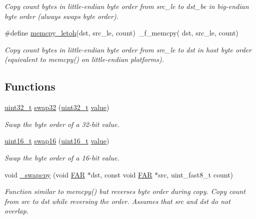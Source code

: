\begin{DoxyCompactItemize}
\begin{DoxyCompactList}\small\item\em Copy {\itshape count} bytes in little-\/endian byte order from {\itshape src\+\_\+le} to {\itshape dst\+\_\+be} in big-\/endian byte order (always swaps byte order). \end{DoxyCompactList}\item 
\mbox{\label{group__util__byteorder_ga9639d55fe8e5b4daf83a76de40aa3e4e}} 
\#define \hyperlink{group__util__byteorder_ga9639d55fe8e5b4daf83a76de40aa3e4e}{memcpy\+\_\+letoh}(dst,  src\+\_\+le,  count)~\+\_\+f\+\_\+memcpy( dst, src\+\_\+le, count)
\begin{DoxyCompactList}\small\item\em Copy {\itshape count} bytes in little-\/endian byte order from {\itshape src\+\_\+le} to {\itshape dst} in host byte order (equivalent to memcpy() on little-\/endian platforms). \end{DoxyCompactList}\end{DoxyCompactItemize}
\subsection*{Functions}
\begin{DoxyCompactItemize}
\item 
\hyperlink{group__hal__dos_ga09a1e304d66d35dd47daffee9731edaa}{uint32\+\_\+t} \hyperlink{group__util__byteorder_ga5bdbc60a02db00841f567d1ade52f877}{swap32} (\hyperlink{group__hal__dos_ga09a1e304d66d35dd47daffee9731edaa}{uint32\+\_\+t} \hyperlink{group__zcl_ga1ed5b151a90f7e99af8cca2e6875ddf4}{value})
\begin{DoxyCompactList}\small\item\em Swap the byte order of a 32-\/bit value. \end{DoxyCompactList}\item 
\hyperlink{group__hal__dos_ga5a8b2dc9e45a9ee81a94ef304fb62505}{uint16\+\_\+t} \hyperlink{group__util__byteorder_ga7cf3526e1af5c8642d2ec02caecf99bc}{swap16} (\hyperlink{group__hal__dos_ga5a8b2dc9e45a9ee81a94ef304fb62505}{uint16\+\_\+t} \hyperlink{group__zcl_ga1ed5b151a90f7e99af8cca2e6875ddf4}{value})
\begin{DoxyCompactList}\small\item\em Swap the byte order of a 16-\/bit value. \end{DoxyCompactList}\item 
void \hyperlink{group__util__byteorder_ga23fd4d4005a80a26ff3c6ba23a4af560}{\+\_\+swapcpy} (void \hyperlink{group__hal_gaef060b3456fdcc093a7210a762d5f2ed}{F\+AR} $\ast$dst, const void \hyperlink{group__hal_gaef060b3456fdcc093a7210a762d5f2ed}{F\+AR} $\ast$src, uint\+\_\+fast8\+\_\+t count)
\begin{DoxyCompactList}\small\item\em Function similar to memcpy() but reverses byte order during copy. Copy {\itshape count} from {\itshape src} to {\itshape dst} while reversing the order. Assumes that {\itshape src} and {\itshape dst} do not overlap. \end{DoxyCompactList}\end{DoxyCompactItemize}


